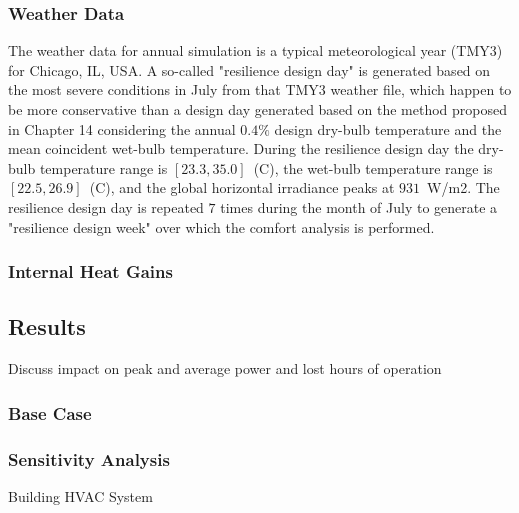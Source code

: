 \subsubsection{Weather Data} \label{sec:weather}

The weather data for annual simulation is a typical meteorological year (TMY3) for Chicago, IL, USA.
A so-called "resilience design day" is generated based on the most severe conditions in July from that TMY3 weather file, which happen to be more conservative than a design day generated based on the method proposed in \cite{ASHRAE2017} Chapter 14 considering the annual $0.4\%$ design dry-bulb temperature and the mean coincident wet-bulb temperature.
During the resilience design day the dry-bulb temperature range is $[23.3, 35.0]$~(C), the wet-bulb temperature range is $[22.5, 26.9]$~(C), and the global horizontal irradiance peaks at $931$~W/m2.
The resilience design day is repeated $7$ times during the month of July to generate a "resilience design week" over which the comfort analysis is performed.

\subsubsection{Internal Heat Gains} \label{sec:gains}



\subsection{Results} \label{sec:results}

Discuss impact on peak and average power and lost hours of operation

\subsubsection{Base Case} \label{sec:base}


\subsubsection{Sensitivity Analysis} \label{sec:sensitivity}

Building HVAC System

